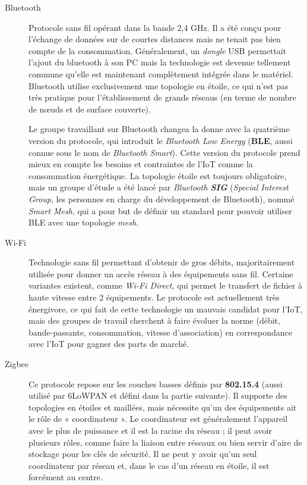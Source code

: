 \begin{description}
	\item[Bluetooth]
	Protocole sans fil opérant dans la bande 2,4 GHz. Il a été conçu pour l'échange de données sur de courtes distances mais ne tenait pas bien compte de la consommation. Généralement, un \textit{dongle} USB permettait l'ajout du bluetooth à son PC mais la technologie est devenue tellement commune qu'elle est maintenant complètement intégrée dans le matériel. Bluetooth utilise exclusivement une topologie en étoile, ce qui n'est pas très pratique pour l'établissement de grands réseaus (en terme de nombre de nœuds et de surface couverte).

	Le groupe travaillant sur Bluetooth changea la donne avec la quatrième version du protocole, qui introduit le \textit{Bluetooth Low Energy} (\textbf{BLE}, aussi connue sous le nom de \textit{Bluetooth Smart}). Cette version du protocole prend mieux en compte les besoins et contraintes de l'IoT comme la consommation énergétique. La topologie étoile est toujours obligatoire, mais un groupe d'étude a été lancé par \textit{Bluetooth \textbf{SIG}} (\textit{Special Interest Group}, les personnes en charge du développement de Bluetooth), nommé \textit{Smart Mesh}, qui a pour but de définir un standard pour pouvoir utiliser BLE avec une topologie \textit{mesh}.

	\item[Wi-Fi]
	Technologie sans fil permettant d'obtenir de gros débits, majoritairement utilisée pour donner un accès réseau à des équipements sans fil. Certaine variantes existent, comme \textit{Wi-Fi Direct}, qui permet le transfert de fichier à haute vitesse entre 2 équipements. Le protocole est actuellement très énergivore, ce qui fait de cette technologie un mauvais candidat pour l'IoT, mais des groupes de travail cherchent à faire évoluer la norme (débit, bande-passante, consommation, vitesse d'association) en correspondance avec l'IoT pour gagner des parts de marché.

	\item[Zigbee]
	Ce protocole repose sur les couches basses définis par \textbf{802.15.4} (aussi utilisé par 6LoWPAN et défini dans la partie suivante). Il supporte des topologies en étoiles et maillées, mais nécessite qu’un des équipements ait le rôle de « coordinateur ». Le coordinateur est généralement l'appareil avec le plus de puissance et il est la racine du réseau ; il peut avoir plusieurs rôles, comme faire la liaison entre réseaux ou bien servir d’aire de stockage pour les clés de sécurité. Il ne peut y avoir qu'un seul coordinateur par réseau et, dans le cas d'un réseau en étoile, il est forcément au centre.


\end{description}
